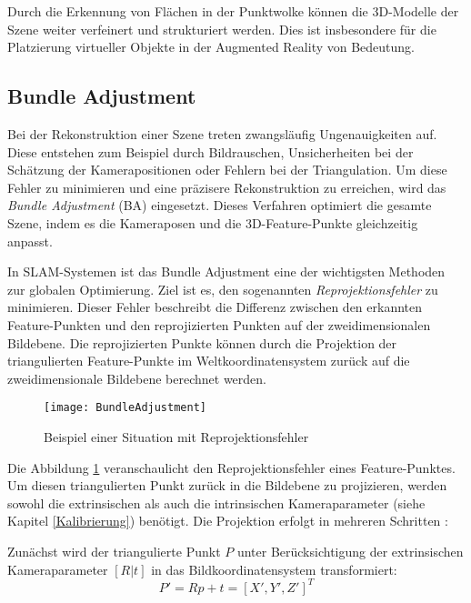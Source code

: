 Durch die Erkennung von Flächen in der Punktwolke können die 3D-Modelle der Szene weiter verfeinert und strukturiert werden. Dies ist insbesondere für die Platzierung virtueller Objekte in der Augmented Reality von Bedeutung. \cite{doerner2022virtual}

\subsection{Bundle Adjustment}

Bei der Rekonstruktion einer Szene treten zwangsläufig Ungenauigkeiten auf. Diese entstehen zum Beispiel durch Bildrauschen, Unsicherheiten bei der Schätzung der Kamerapositionen oder Fehlern bei der Triangulation. Um diese Fehler zu minimieren und eine präzisere Rekonstruktion zu erreichen, wird das \textit{Bundle Adjustment} (BA) eingesetzt. Dieses Verfahren optimiert die gesamte Szene, indem es die Kameraposen und die 3D-Feature-Punkte gleichzeitig anpasst. \cite{gao2021vSLAM}

In SLAM-Systemen ist das Bundle Adjustment eine der wichtigsten Methoden zur globalen Optimierung. Ziel ist es, den sogenannten \textit{Reprojektionsfehler} zu minimieren. Dieser Fehler beschreibt die Differenz zwischen den erkannten Feature-Punkten und den reprojizierten Punkten auf der zweidimensionalen Bildebene. Die reprojizierten Punkte können durch die Projektion der triangulierten Feature-Punkte im Weltkoordinatensystem zurück auf die zweidimensionale Bildebene berechnet werden. \cite{gao2021vSLAM}

\begin{figure}
    \centering
    \texttt{[image: BundleAdjustment]}
    \caption{Beispiel einer Situation mit Reprojektionsfehler\label{fig:BA}}\par
\end{figure}

Die Abbildung \ref{fig:BA} veranschaulicht den Reprojektionsfehler eines Feature-Punktes. Um diesen triangulierten Punkt zurück in die Bildebene zu projizieren, werden sowohl die extrinsischen als auch die intrinsischen Kameraparameter (siehe Kapitel \ref{Kalibrierung}) benötigt. Die Projektion erfolgt in mehreren Schritten \cite{gao2021vSLAM}:

Zunächst wird der triangulierte Punkt \( P \) unter Berücksichtigung der extrinsischen Kameraparameter \( [R|t] \) in das Bildkoordinatensystem transformiert:
\begin{equation}
    P' = Rp+t = [X', Y', Z']^T
\end{equation}

